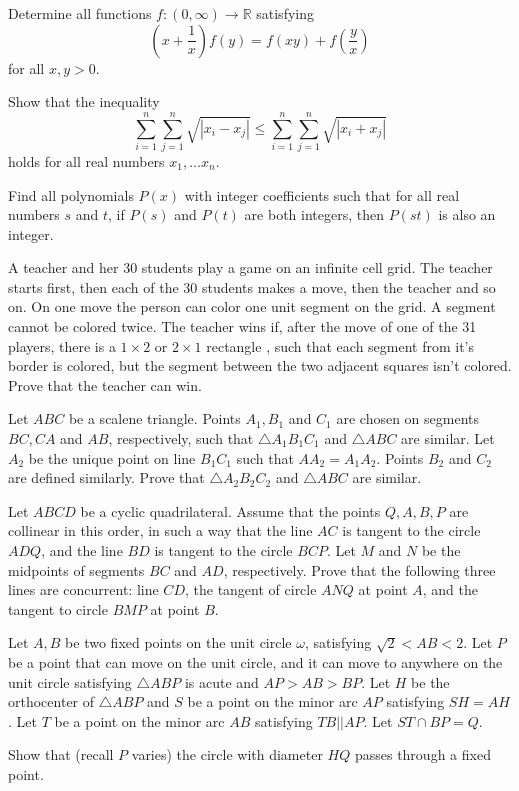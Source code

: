 \documentclass[11pt]{scrartcl}
\begin{document}
\begin{problem}[5514383858686655851]
Determine all functions $f:(0,\infty)\to\mathbb{R}$ satisfying$$\left(x+\frac{1}{x}\right)f(y)=f(xy)+f\left(\frac{y}{x}\right)$$for all $x,y>0$.
\end{problem}
\begin{problem}[952584318797289]
Show that the inequality\[\sum_{i=1}^n \sum_{j=1}^n \sqrt{|x_i-x_j|}\leqslant \sum_{i=1}^n \sum_{j=1}^n \sqrt{|x_i+x_j|}\]holds for all real numbers $x_1,\ldots x_n.$
\end{problem}
\begin{problem}[5173505438503336781]
Find all polynomials $P(x)$ with integer coefficients such that for all real numbers $s$ and $t$, if $P(s)$ and $P(t)$ are both integers, then $P(st)$ is also an integer.
\end{problem}
\begin{problem}[303061622555285]
A teacher and her 30 students play a game on an infinite cell grid. The teacher starts first, then each of the 30 students makes a move, then the teacher and so on. On one move the person can color one unit segment on the grid. A segment cannot be colored twice. The teacher wins if, after the move of one of the 31 players, there is a $1\times 2$ or $2\times 1$ rectangle , such that each segment from it's border is colored, but the segment between the two adjacent squares isn't colored. Prove that the teacher can win.
\end{problem}
\begin{problem}[3031913484181592371]
Let $ABC$ be a scalene triangle. Points $A_1,B_1$ and $C_1$ are chosen on segments $BC,CA$ and $AB$, respectively, such that $\triangle A_1B_1C_1$ and $\triangle ABC$ are similar. Let $A_2$ be the unique point on line $B_1C_1$ such that $AA_2=A_1A_2$. Points $B_2$ and $C_2$ are defined similarly. Prove that $\triangle A_2B_2C_2$ and $\triangle ABC$ are similar.
\end{problem}
\begin{problem}[6193947856984766386]
Let $ABCD$ be a cyclic quadrilateral. Assume that the points $Q, A, B, P$ are collinear in this order, in such a way that the line $AC$ is tangent to the circle $ADQ$, and the line $BD$ is tangent to the circle $BCP$. Let $M$ and $N$ be the midpoints of segments $BC$ and $AD$, respectively. Prove that the following three lines are concurrent: line $CD$, the tangent of circle $ANQ$ at point $A$, and the tangent to circle $BMP$ at point $B$.
\end{problem}
\begin{problem}[308110166188097]
Let $A,B$ be two fixed points on the unit circle $\omega$, satisfying $\sqrt{2} < AB < 2$. Let $P$ be a point that can move on the unit circle, and it can move to anywhere on the unit circle satisfying $\triangle ABP$ is acute and $AP>AB>BP$. Let $H$ be the orthocenter of $\triangle ABP$ and $S$ be a point on the minor arc $AP$ satisfying $SH=AH$. Let $T$ be a point on the minor arc $AB$ satisfying $TB || AP$. Let $ST\cap BP = Q$.

Show that (recall $P$ varies) the circle with diameter $HQ$ passes through a fixed point.
\end{problem}
\end{document}

